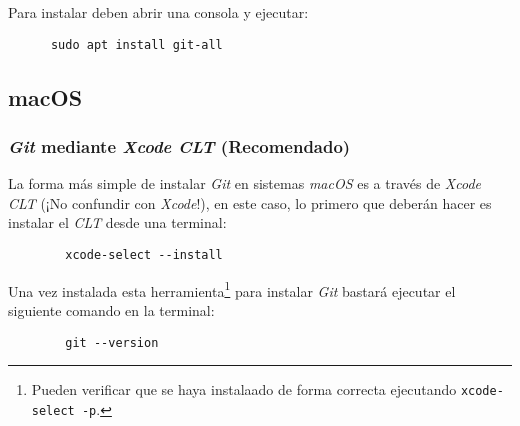     Para instalar deben abrir una consola y ejecutar:
    \begin{verbatim}
      sudo apt install git-all 
    \end{verbatim}

  \subsection{macOS}
    \subsubsection{\textit{Git} mediante \textit{Xcode CLT} (Recomendado)}
      La forma más simple de instalar \textit{Git} en sistemas \textit{macOS} es a 
      través de \textit{Xcode CLT} (¡No confundir con \textit{Xcode}!), en este 
      caso, lo primero que deberán hacer es instalar el \textit{CLT} desde una terminal:
      
      \begin{verbatim}
        xcode-select --install
      \end{verbatim}
      
      Una vez instalada esta herramienta\footnote{Pueden verificar que se haya instalaado de forma 
      correcta ejecutando \texttt{xcode-select -p}.} para instalar \textit{Git} bastará ejecutar el
      siguiente comando en la terminal:

      \begin{verbatim}
        git --version
      \end{verbatim}
